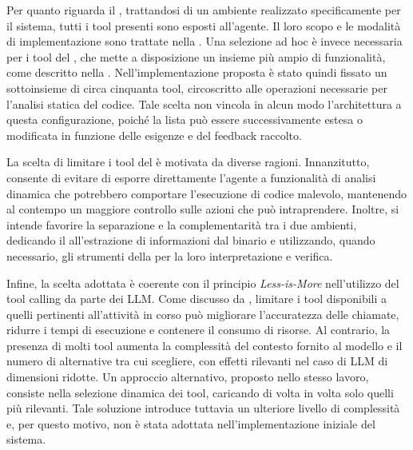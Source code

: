 Per quanto riguarda il \sandbox{}, trattandosi di un ambiente realizzato specificamente per il sistema, tutti i tool presenti sono esposti all'agente. Il loro scopo e le modalità di implementazione sono trattate nella . Una selezione ad hoc è invece necessaria per i tool del \sreframework{}, che mette a disposizione un insieme più ampio di funzionalità, come descritto nella . Nell'implementazione proposta è stato quindi fissato un sottoinsieme di circa cinquanta tool, circoscritto alle operazioni necessarie per l'analisi statica del codice. Tale scelta non vincola in alcun modo l'architettura a questa configurazione, poiché la lista può essere successivamente estesa o modificata in funzione delle esigenze e del feedback raccolto.


La scelta di limitare i tool del \sreframework{} è motivata da diverse ragioni. Innanzitutto, consente di evitare di esporre direttamente l'agente a funzionalità di analisi dinamica che potrebbero comportare l'esecuzione di codice malevolo, mantenendo al contempo un maggiore controllo sulle azioni che può intraprendere. Inoltre, si intende favorire la separazione e la complementarità tra i due ambienti, dedicando il \sreframework{} all'estrazione di informazioni dal binario e utilizzando, quando necessario, gli strumenti della \sandbox{} per la loro interpretazione e verifica.

Infine, la scelta adottata è coerente con il principio \emph{Less-is-More} nell'utilizzo del tool calling da parte dei LLM. Come discusso da \textcite{paramanayakam2025less}, limitare i tool disponibili a quelli pertinenti all'attività in corso può migliorare l'accuratezza delle chiamate, ridurre i tempi di esecuzione e contenere il consumo di risorse. Al contrario, la presenza di molti tool aumenta la complessità del contesto fornito al modello e il numero di alternative tra cui scegliere, con effetti rilevanti nel caso di LLM di dimensioni ridotte. Un approccio alternativo, proposto nello stesso lavoro, consiste nella selezione dinamica dei tool, caricando di volta in volta solo quelli più rilevanti. Tale soluzione introduce tuttavia un ulteriore livello di complessità e, per questo motivo, non è stata adottata nell'implementazione iniziale del sistema.


\subsubsection{\kb{}}

